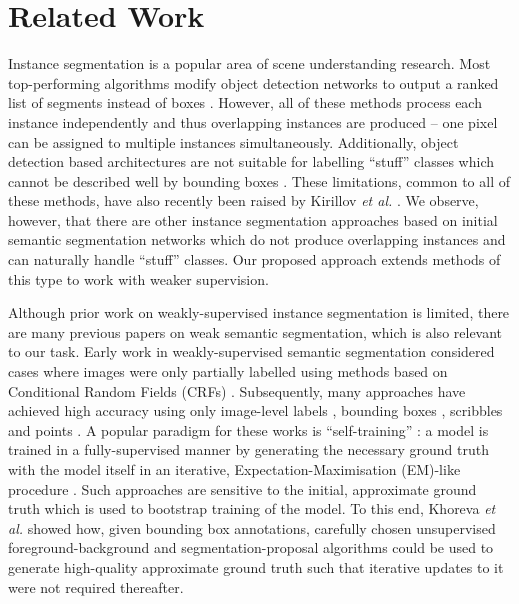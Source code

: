 \documentclass[runningheads]{llncs}
\def\etal{\emph{et al.} }
\begin{document}
 \section{Related Work}
Instance segmentation is a popular area of scene understanding research.
Most top-performing algorithms modify object detection networks to output a ranked list of segments instead of boxes \cite{he_iccv_2017,dai_cvpr_2016,li_cvpr_2017,liu_arxiv_2018,liu_cvpr_2016,hariharan_2014}.
However, all of these methods process each instance independently and thus overlapping instances are produced -- one pixel can be assigned to multiple instances simultaneously.
Additionally, object detection based architectures are not suitable for labelling ``stuff'' classes which cannot be described well by bounding boxes \cite{lin_di_cvpr_2016}.
These limitations, common to all of these methods, have also recently been raised by Kirillov \etal\cite{kirillov_arxiv_2018}.
We observe, however, that there are other instance segmentation approaches based on initial semantic segmentation networks \cite{arnab_cvpr_2017,bai_cvpr_2017,brabandere_cvprw_2017,kirillov_cvpr_2017} which do not produce overlapping instances and can naturally handle ``stuff'' classes.
Our proposed approach extends methods of this type to work with weaker supervision.

Although prior work on weakly-supervised instance segmentation is limited, there are many previous papers on weak semantic segmentation, which is also relevant to our task.
Early work in weakly-supervised semantic segmentation considered cases where images were only partially labelled using methods based on Conditional Random Fields (CRFs) \cite{verbeek_nips_2008,he_nips_2009}.
Subsequently, many approaches have achieved high accuracy using only image-level labels \cite{kolesnikov_eccv_2016,wei_cvpr_2017,pinheiro_cvpr_2015,pathak_iccv_2015}, bounding boxes \cite{khoreva_cvpr_2017,papandreou_2015,dai_2015}, scribbles \cite{lin_di_cvpr_2016} and points \cite{bearman_arxiv_2015}.
A popular paradigm for these works is ``self-training'' \cite{scudder_1965}: a model is trained in a fully-supervised manner by generating the necessary ground truth with the model itself in an iterative, Expectation-Maximisation (EM)-like procedure \cite{papandreou_2015,dai_2015,lin_di_cvpr_2016,pathak_iccv_2015}.
Such approaches are sensitive to the initial, approximate ground truth which is used to bootstrap training of the model.
To this end, Khoreva \etal \cite{khoreva_cvpr_2017} showed how, given bounding box annotations, carefully chosen unsupervised foreground-background and segmentation-proposal algorithms could be used to generate high-quality approximate ground truth such that iterative updates to it were not required thereafter.
\end{document}

